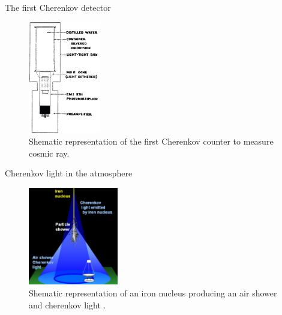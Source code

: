 \documentclass[aspectratio=1610, 10pt]{beamer}
\begin{document}
\begin{frame}{The first Cherenkov detector}
  \begin{figure}
    \includegraphics[width=0.28\textwidth]{images/the_first.png}
    \caption{Shematic representation of the first Cherenkov counter to measure cosmic ray. \cite{gaseous}}
  \end{figure}
\end{frame}

\begin{frame}{Cherenkov light in the atmosphere}
  \begin{figure}
    \includegraphics[width=0.35\textwidth]{images/cherenkov_cone.png}
    \caption{Shematic representation of an iron nucleus producing an air shower and cherenkov light \cite{hess}.}
  \end{figure}
\end{frame}
\end{document}
